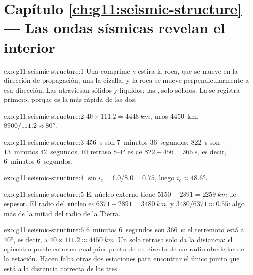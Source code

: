 \section*{Capítulo \ref{ch:g11:seismic-structure} --- Las ondas sísmicas revelan el interior}

\begin{solution}{exo:g11:seismic-structure:1}
Una  comprime y estira la roca, que se mueve en la dirección de
propagación; una  la cizalla, y la roca se mueve perpendicularmente a
esa dirección. Las  atraviesan sólidos y líquidos; las , solo
sólidos. La  se registra primero, porque es la más rápida de las dos.
\end{solution}

\begin{solution}{exo:g11:seismic-structure:2}
$40 \times 111.2 = \qty{4448}{km}$, unos \qty{4450}{km}. $8900/111.2
\approx \ang{80}$.
\end{solution}

\begin{solution}{exo:g11:seismic-structure:3}
\qty{456}{s} son 7~minutos 36~segundos; \qty{822}{s} son 13~minutos
42~segundos. El retraso S--P es de $822 - 456 = \qty{366}{s}$, es decir,
6~minutos 6~segundos.
\end{solution}

\begin{solution}{exo:g11:seismic-structure:4}
$\sin i_c = 6.0/8.0 = 0.75$, luego $i_c \approx \ang{48.6}$.
\end{solution}

\begin{solution}{exo:g11:seismic-structure:5}
El núcleo externo tiene $5150 - 2891 = \qty{2259}{km}$ de espesor. El radio
del núcleo es $6371 - 2891 = \qty{3480}{km}$, y $3480/6371 \approx 0.55$: algo
más de la mitad del radio de la Tierra.
\end{solution}

\begin{solution}{exo:g11:seismic-structure:6}
6~minutos 6~segundos son \qty{366}{s}: el terremoto está a \ang{40}, es decir,
a $40 \times 111.2 \approx \qty{4450}{km}$. Un solo retraso solo da la
distancia: el epicentro puede estar en cualquier punto de un círculo de ese
radio alrededor de la estación. Hacen falta otras dos estaciones para
encontrar el único punto que está a la distancia correcta de las tres.
\end{solution}

